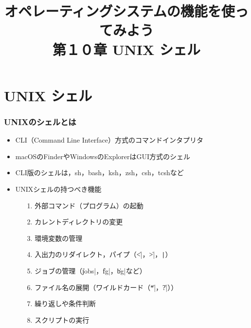 \documentclass{beamer}                 %
\begin{document}
\title{オペレーティングシステムの機能を使ってみよう\\
第１０章 UNIX シェル}
\date{}

\begin{frame}
  \titlepage
\end{frame}

\section{UNIX シェル}
\begin{frame}[fragile]
  \frametitle{UNIXのシェルとは}
  \begin{itemize}
    \item CLI（Command Line Interface）方式のコマンドインタプリタ
    \item macOSのFinderやWindowsのExplorerはGUI方式のシェル
    \item CLI版のシェルは，sh，bash，ksh，zsh，csh，tcshなど
    \item UNIXシェルの持つべき機能
      \begin{enumerate}
      \item[1.] 外部コマンド（プログラム）の起動
      \item[2.] カレントディレクトリの変更
      \item[3.] 環境変数の管理
      \item[4.] 入出力のリダイレクト，パイプ（\|<|，\|>|，\verb;|;）
      \item[5.] ジョブの管理（\|jobs|，\|fg|，\|bg|など）
      \item[6.] ファイル名の展開（ワイルドカード（\|*|，\|?|））
      \item[7.] 繰り返しや条件判断
      \item[8.] スクリプトの実行
      \end{enumerate}
  \end{itemize}
  \vfill
\end{frame}
\end{document}
